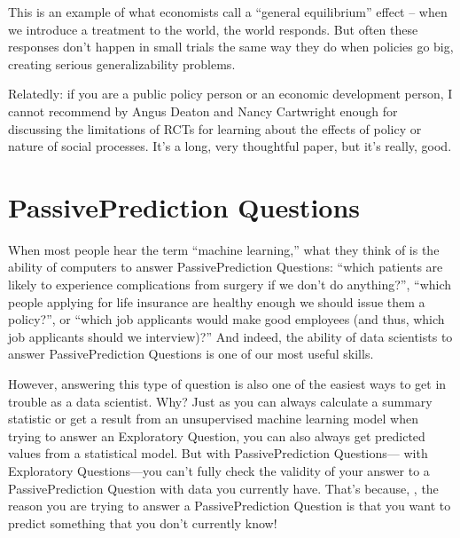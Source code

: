 \documentclass[letterpaper,10pt,english]{jupyterBook}
\begin{document}
\sphinxAtStartPar
This is an example of what economists call a “general equilibrium” effect – when we introduce a treatment to the world, the world responds. But often these responses don’t happen in small trials the same way they do when policies go big, creating serious generalizability problems.

\sphinxAtStartPar
Relatedly: if you are a public policy person or an economic development person, I cannot recommend  by Angus Deaton and Nancy Cartwright enough for discussing the limitations of RCTs for learning about the effects of policy or nature of social processes. It’s a long, very thoughtful paper, but it’s really,  good.

\sphinxstepscope


\chapter{Passive\sphinxhyphen{}Prediction Questions}
\label{\detokenize{30_questions/20_passive_prediction_questions:passive-prediction-questions}}\label{\detokenize{30_questions/20_passive_prediction_questions::doc}}
\sphinxAtStartPar
When most people hear the term “machine learning,” what they think of is the ability of computers to answer Passive\sphinxhyphen{}Prediction Questions: “which patients are likely to experience complications from surgery if we don’t do anything?”, “which people applying for life insurance are healthy enough we should issue them a policy?”, or “which job applicants would make good employees (and thus, which job applicants should we interview)?” And indeed, the ability of data scientists to answer Passive\sphinxhyphen{}Prediction Questions is one of our most useful skills.

\sphinxAtStartPar
However, answering this type of question is also one of the easiest ways to get in trouble as a data scientist. Why? Just as you can always calculate a summary statistic or get a result from an unsupervised machine learning model when trying to answer an Exploratory Question, you can also always get predicted values from a statistical model. But with Passive\sphinxhyphen{}Prediction Questions— with Exploratory Questions—you can’t fully check the validity of your answer to a Passive\sphinxhyphen{}Prediction Question with data you currently have. That’s because, , the reason you are trying to answer a Passive\sphinxhyphen{}Prediction Question is that you want to predict something that you don’t currently know!
\end{document}

